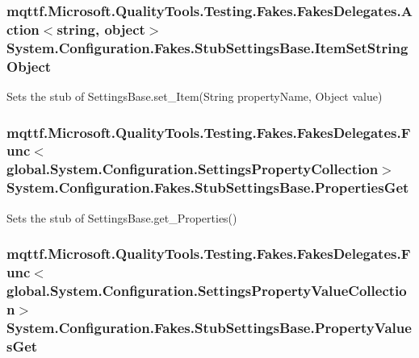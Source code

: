 \hypertarget{class_system_1_1_configuration_1_1_fakes_1_1_stub_settings_base_a768d290400072288ee69cfd4d76a8cff}{
\subsubsection[{Item\-Set\-String\-Object}]{\setlength{\rightskip}{0pt plus 5cm}mqttf.\-Microsoft.\-Quality\-Tools.\-Testing.\-Fakes.\-Fakes\-Delegates.\-Action$<$string, object$>$ System.\-Configuration.\-Fakes.\-Stub\-Settings\-Base.\-Item\-Set\-String\-Object}}\label{class_system_1_1_configuration_1_1_fakes_1_1_stub_settings_base_a768d290400072288ee69cfd4d76a8cff}


Sets the stub of Settings\-Base.\-set\-\_\-\-Item(\-String property\-Name, Object value)

\hypertarget{class_system_1_1_configuration_1_1_fakes_1_1_stub_settings_base_a95e3db8fafe78b265086ff26ed463a3c}{
\subsubsection[{Properties\-Get}]{\setlength{\rightskip}{0pt plus 5cm}mqttf.\-Microsoft.\-Quality\-Tools.\-Testing.\-Fakes.\-Fakes\-Delegates.\-Func$<$global.\-System.\-Configuration.\-Settings\-Property\-Collection$>$ System.\-Configuration.\-Fakes.\-Stub\-Settings\-Base.\-Properties\-Get}}\label{class_system_1_1_configuration_1_1_fakes_1_1_stub_settings_base_a95e3db8fafe78b265086ff26ed463a3c}


Sets the stub of Settings\-Base.\-get\-\_\-\-Properties()

\hypertarget{class_system_1_1_configuration_1_1_fakes_1_1_stub_settings_base_a9b833de378e6b638f48bb1d3fc54fa31}{
\subsubsection[{Property\-Values\-Get}]{\setlength{\rightskip}{0pt plus 5cm}mqttf.\-Microsoft.\-Quality\-Tools.\-Testing.\-Fakes.\-Fakes\-Delegates.\-Func$<$global.\-System.\-Configuration.\-Settings\-Property\-Value\-Collection$>$ System.\-Configuration.\-Fakes.\-Stub\-Settings\-Base.\-Property\-Values\-Get}}\label{class_system_1_1_configuration_1_1_fakes_1_1_stub_settings_base_a9b833de378e6b638f48bb1d3fc54fa31}


